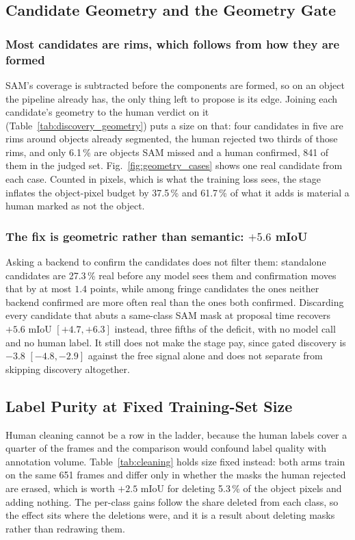 \documentclass[journal]{IEEEtran}
\begin{document}


\subsection{Candidate Geometry and the Geometry Gate}
\label{exp:geometry}

\subsubsection{Most candidates are rims, which follows from how they are formed}
SAM's coverage is subtracted before the components are formed, so on an object the pipeline already has, the only thing left to propose is its edge.
Joining each candidate's geometry to the human verdict on it (Table~\ref{tab:discovery_geometry}) puts a size on that: four candidates in five are rims around objects already segmented, the human rejected two thirds of those rims, and only 6.1\,\% are objects SAM missed and a human confirmed, 841 of them in the judged set.
Fig.~\ref{fig:geometry_cases} shows one real candidate from each case.
Counted in pixels, which is what the training loss sees, the stage inflates the object-pixel budget by 37.5\,\% and 61.7\,\% of what it adds is material a human marked as not the object.

\subsubsection{The fix is geometric rather than semantic: $+5.6$ mIoU}
Asking a backend to confirm the candidates does not filter them: standalone candidates are 27.3\,\% real before any model sees them and confirmation moves that by at most $1.4$ points, while among fringe candidates the ones neither backend confirmed are more often real than the ones both confirmed.
Discarding every candidate that abuts a same-class SAM mask at proposal time recovers $+5.6$ mIoU $[+4.7, +6.3]$ instead, three fifths of the deficit, with no model call and no human label.
It still does not make the stage pay, since gated discovery is $-3.8$ $[-4.8, -2.9]$ against the free signal alone and does not separate from skipping discovery altogether.

\subsection{Label Purity at Fixed Training-Set Size}
\label{exp:purity}

Human cleaning cannot be a row in the ladder, because the human labels cover a quarter of the frames and the comparison would confound label quality with annotation volume.
Table~\ref{tab:cleaning} holds size fixed instead: both arms train on the same 651 frames and differ only in whether the masks the human rejected are erased, which is worth $+2.5$ mIoU for deleting 5.3\,\% of the object pixels and adding nothing.
The per-class gains follow the share deleted from each class, so the effect sits where the deletions were, and it is a result about deleting masks rather than redrawing them.
\end{document}
